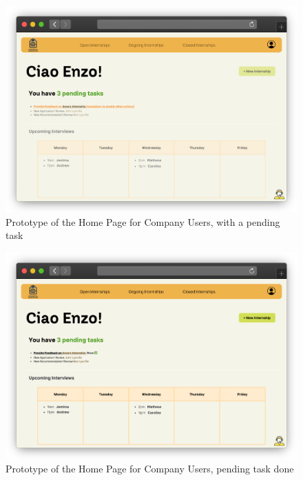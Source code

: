 \begin{figure}[H]
    \centering
    \includegraphics[width=\textwidth]{Images/userInterface-CompanyHomePending.png}
    \caption{Prototype of the Home Page for Company Users, with a pending task}
    \label{fig:CompanyHomePending-user_interface}
\end{figure}


\begin{figure}[H]
    \centering
    \includegraphics[width=\textwidth]{Images/userInterface-CompanyHomeDone.png}
    \caption{Prototype of the Home Page for Company Users, pending task done}
    \label{fig:CompanyHomeDone-user_interface}
\end{figure}


